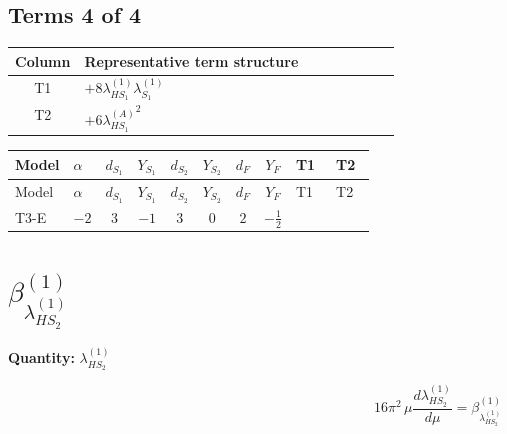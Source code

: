 \documentclass[8pt]{article}
\begin{document}
\begin{landscape}
\subsection*{Terms 4 of 4}
\begin{center}
\begin{tabular}{@{}c >{\raggedright\arraybackslash}p{0.82\linewidth}@{}}
\toprule
Column & Representative term structure \\
\midrule
T1 & \(\displaystyle +8 {\lambda_{HS_1}^{(1)}} {\lambda_{S_1}^{(1)}}\) \\
\midrule
T2 & \(\displaystyle +6 {\lambda_{HS_1}^{(A)}}^2\) \\
\midrule
\bottomrule
\end{tabular}
\end{center}
\smallskip
\tiny
\begin{longtable}{@{}llcccccc >{\raggedright\arraybackslash}p{0.21\linewidth} >{\raggedright\arraybackslash}p{0.21\linewidth}@{}}
\toprule
Model & $\alpha$ & $d_{S_1}$ & $Y_{S_1}$ & $d_{S_2}$ & $Y_{S_2}$ & $d_F$ & $Y_F$ & T1 & T2 \\
\midrule
\endfirsthead
\toprule
Model & $\alpha$ & $d_{S_1}$ & $Y_{S_1}$ & $d_{S_2}$ & $Y_{S_2}$ & $d_F$ & $Y_F$ & T1 & T2 \\
\midrule
\endhead
T3-E & $-2$ & $3$ & $-1$ & $3$ & $0$ & $2$ & $-\frac{1}{2}$ & \scriptsize\adjustbox{max width=\linewidth}{$\begin{gathered} +8 {\lambda_{HS_1}^{(1)}} {\lambda_{S_1}^{(1)}}\end{gathered}$} & \scriptsize\adjustbox{max width=\linewidth}{$\begin{gathered} +6 {\lambda_{HS_1}^{(A)}}^2\end{gathered}$} \\
\midrule
\bottomrule
\end{longtable}
\clearpage
\section*{$\beta_{\lambda_{HS_2}^{(1)}}^{(1)}$}
\noindent\textbf{Quantity: }$\lambda_{HS_2}^{(1)}$\par\smallskip
\[16\pi^2\,\mu\frac{d \lambda_{HS_2}^{(1)}}{d\mu}=\beta_{\lambda_{HS_2}^{(1)}}^{(1)}\]

\end{landscape}
\end{document}
